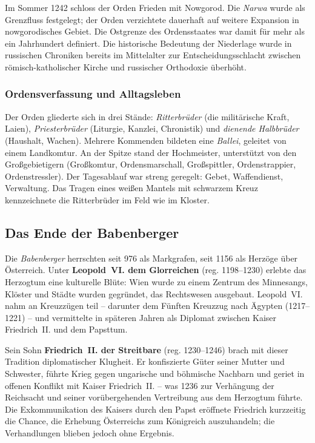 Im Sommer 1242 schloss der Orden Frieden mit Nowgorod. Die \textit{Narwa} wurde als Grenzfluss festgelegt; der Orden verzichtete dauerhaft auf weitere Expansion in nowgorodisches Gebiet. Die Ostgrenze des Ordensstaates war damit für mehr als ein Jahrhundert definiert. Die historische Bedeutung der Niederlage wurde in russischen Chroniken bereits im Mittelalter zur Entscheidungsschlacht zwischen römisch-katholischer Kirche und russischer Orthodoxie überhöht. \cite{selart_livland}

\subsubsection{Ordensverfassung und Alltagsleben}\label{ordensverfassung}

Der Orden gliederte sich in drei Stände: \textit{Ritterbrüder} (die militärische Kraft, Laien), \textit{Priesterbrüder} (Liturgie, Kanzlei, Chronistik) und \textit{dienende Halbbrüder} (Haushalt, Wachen). Mehrere Kommenden bildeten eine \textit{Ballei}, geleitet von einem Landkomtur. An der Spitze stand der Hochmeister, unterstützt von den Großgebietigern (Großkomtur, Ordensmarschall, Großspittler, Ordenstrappier, Ordenstressler). Der Tagesablauf war streng geregelt: Gebet, Waffendienst, Verwaltung. Das Tragen eines weißen Mantels mit schwarzem Kreuz kennzeichnete die Ritterbrüder im Feld wie im Kloster. \cite{boockmann_deutscher_orden,militzer_deutscher_orden}

\subsection{Das Ende der Babenberger}\label{ende_der_babenberger}

Die \textit{Babenberger} herrschten seit 976 als Markgrafen, seit 1156 als Herzöge über Österreich. Unter \textbf{Leopold~VI. dem Glorreichen} (reg. 1198--1230) erlebte das Herzogtum eine kulturelle Blüte: Wien wurde zu einem Zentrum des Minnesangs, Klöster und Städte wurden gegründet, das Rechtswesen ausgebaut. Leopold~VI. nahm an Kreuzzügen teil -- darunter dem Fünften Kreuzzug nach Ägypten (1217--1221) -- und vermittelte in späteren Jahren als Diplomat zwischen Kaiser Friedrich~II. und dem Papsttum. \cite{lechner_babenberger,niederstaetter_oesterreich}

Sein Sohn \textbf{Friedrich~II. der Streitbare} (reg. 1230--1246) brach mit dieser Tradition diplomatischer Klugheit. Er konfiszierte Güter seiner Mutter und Schwester, führte Krieg gegen ungarische und böhmische Nachbarn und geriet in offenen Konflikt mit Kaiser Friedrich~II. -- was 1236 zur Verhängung der Reichsacht und seiner vorübergehenden Vertreibung aus dem Herzogtum führte. Die Exkommunikation des Kaisers durch den Papst eröffnete Friedrich kurzzeitig die Chance, die Erhebung Österreichs zum Königreich auszuhandeln; die Verhandlungen blieben jedoch ohne Ergebnis. \cite{lechner_babenberger,niederstaetter_oesterreich}


